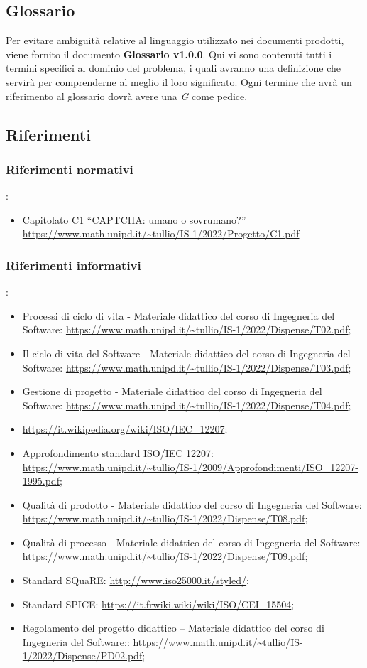 \subsection{Glossario}
Per evitare ambiguità relative al linguaggio utilizzato nei documenti prodotti, viene fornito il documento \textbf{Glossario v1.0.0}. Qui vi sono contenuti tutti i termini specifici al dominio del problema, i quali avranno una definizione che servirà per comprenderne al meglio il loro significato. Ogni termine che avrà un riferimento al glossario dovrà avere una \textit{G} come pedice. 

\subsection{Riferimenti}

\subsubsection{Riferimenti normativi}:
\begin{itemize}
	\item Capitolato C1 “CAPTCHA: umano o sovrumano?”
	\url{https://www.math.unipd.it/~tullio/IS-1/2022/Progetto/C1.pdf}
\end{itemize}

\subsubsection{Riferimenti informativi}:
\begin{itemize}
	\item Processi di ciclo di vita - Materiale didattico del corso di Ingegneria del Software: \url{https://www.math.unipd.it/~tullio/IS-1/2022/Dispense/T02.pdf};
	\item Il ciclo di vita del Software - Materiale didattico del corso di Ingegneria del Software: \url{https://www.math.unipd.it/~tullio/IS-1/2022/Dispense/T03.pdf};
	\item Gestione di progetto - Materiale didattico del corso di Ingegneria del Software: \url{https://www.math.unipd.it/~tullio/IS-1/2022/Dispense/T04.pdf};
	\item \url{https://it.wikipedia.org/wiki/ISO/IEC_12207};
	\item Approfondimento standard ISO/IEC 12207:  \url{https://www.math.unipd.it/~tullio/IS-1/2009/Approfondimenti/ISO_12207-1995.pdf};
	\item Qualità di prodotto - Materiale didattico del corso di Ingegneria del Software: \url{https://www.math.unipd.it/~tullio/IS-1/2022/Dispense/T08.pdf};
	\item Qualità di processo - Materiale didattico del corso di Ingegneria del Software: \url{https://www.math.unipd.it/~tullio/IS-1/2022/Dispense/T09.pdf};
	\item Standard SQuaRE: \url{http://www.iso25000.it/styled/};
	\item Standard SPICE: \url{https://it.frwiki.wiki/wiki/ISO/CEI_15504};
	\item Regolamento del progetto didattico – Materiale didattico del corso di Ingegneria del Software::
	\url{https://www.math.unipd.it/~tullio/IS-1/2022/Dispense/PD02.pdf};
\end{itemize}
